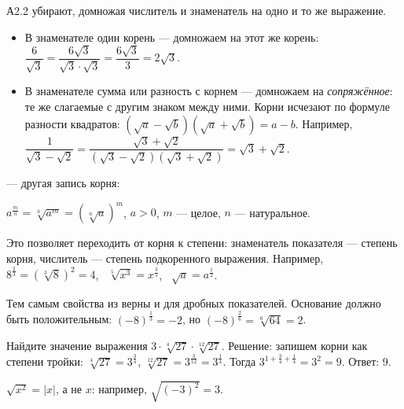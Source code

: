 \begin{tema}{А2.2}
 убирают, домножая числитель и знаменатель
на одно и то же выражение.
\begin{itemize}[itemsep=1pt, topsep=2pt]
  \item В знаменателе один корень — домножаем на этот же корень:
        $\dfrac6{\sqrt3}=\dfrac{6\sqrt3}{\sqrt3\cdot\sqrt3}=\dfrac{6\sqrt3}3=2\sqrt3$.
  \item В знаменателе сумма или разность с корнем — домножаем на \emph{сопряжённое}:
        те же слагаемые с другим знаком между ними. Корни исчезают по формуле
        разности квадратов: $(\sqrt a-\sqrt b)(\sqrt a+\sqrt b)=a-b$. Например,
        $\dfrac1{\sqrt3-\sqrt2}=\dfrac{\sqrt3+\sqrt2}{(\sqrt3-\sqrt2)(\sqrt3+\sqrt2)}=\sqrt3+\sqrt2$.
\end{itemize}

 — другая запись корня:
\begin{klyuch}
$a^{\frac mn}=\sqrt[n]{a^m}=\left(\sqrt[n]a\right)^m$, \quad $a>0$, $m$ — целое, $n$ — натуральное.
\end{klyuch}
Это позволяет переходить от корня к степени: знаменатель показателя — степень корня,
числитель — степень подкоренного выражения.
Например, $8^{\frac23}=\left(\sqrt[3]8\right)^2=4$, \ $\sqrt[5]{x^3}=x^{\frac35}$, \ $\sqrt a=a^{\frac12}$.

Тем самым свойства из  верны и для дробных показателей. Основание должно быть
положительным: $(-8)^{\frac13}=-2$, но $(-8)^{\frac26}=\sqrt[6]{64}=2$.

\begin{primer}
Найдите значение выражения $3\cdot\sqrt[4]{27}\cdot\sqrt[12]{27}$.
Решение: запишем корни как степени тройки: $\sqrt[4]{27}=3^{\frac34}$,
$\sqrt[12]{27}=3^{\frac3{12}}=3^{\frac14}$. Тогда
$3^{1+\frac34+\frac14}=3^2=9$. Ответ: 9.
\end{primer}

\begin{oshibka}
$\sqrt{x^2}=|x|$, а не $x$: например, $\sqrt{(-3)^2}=3$.
\end{oshibka}
\end{tema}
